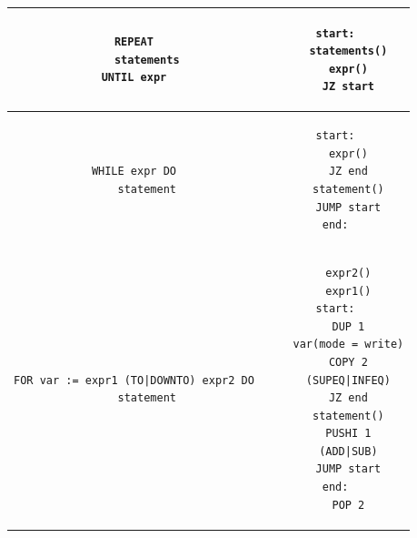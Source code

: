 \documentclass[12pt, a4paper]{article}
\begin{document}
\begin{longtable}{|c|c|}
    \hline
    \begin{minipage}{0.5\textwidth}
        \begin{lstlisting}
REPEAT
    statements
UNTIL expr
\end{lstlisting}
    \end{minipage} &
    \begin{minipage}{0.5\textwidth}
        \begin{lstlisting}
start:
    statements()
    expr()
    JZ start
\end{lstlisting}
    \end{minipage} \\

    \hline
    \begin{minipage}{0.5\textwidth}
        \begin{lstlisting}
WHILE expr DO
    statement
\end{lstlisting}
    \end{minipage} &
    \begin{minipage}{0.5\textwidth}
        \begin{lstlisting}
start:
    expr()
    JZ end
    statement()
    JUMP start
end:
\end{lstlisting}
    \end{minipage} \\
    \hline

    \hline
    \begin{minipage}{0.5\textwidth}
        \begin{lstlisting}
FOR var := expr1 (TO|DOWNTO) expr2 DO
    statement
\end{lstlisting}
    \end{minipage} &
    \begin{minipage}{0.5\textwidth}
        \begin{lstlisting}
    expr2()
    expr1()
start:
    DUP 1
    var(mode = write)
    COPY 2
    (SUPEQ|INFEQ)
    JZ end
    statement()
    PUSHI 1
    (ADD|SUB)
    JUMP start
end:
    POP 2
\end{lstlisting}
    \end{minipage} \\
    \hline
\end{longtable}
\end{document}
